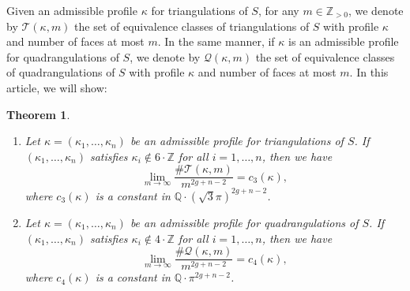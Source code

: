 \documentclass[11pt]{article}
\newcommand{\skpt}{\smallskip}
\numberwithin{equation}{section}
\newenvironment{enumeratei}
{\bgroup\def\theenumi{\roman{enumi}}\def\theenumii{\arabic{enumii}}\begin{enumerate}}
{\end{enumerate}\egroup}
\theoremstyle{plain}
\newtheorem{Theorem}{Theorem}[section]
\theoremstyle{definition}
\newcommand\Z{\mathbb{Z}}
\newcommand{\Q}{\mathbb{Q}}
\newcommand{\QQ}{\mathscr{Q}}
\newcommand{\TT}{\mathscr{T}}
\begin{document}
Given an admissible profile $\kappa$ for triangulations of $S$, for any $m\in \Z_{>0}$, we denote by $\TT(\kappa,m)$ the set of equivalence classes of triangulations of $S$ with profile $\kappa$ and number of faces at most $m$. In the same manner, if $\kappa$ is an admissible profile for quadrangulations of $S$, we denote by $\QQ(\kappa,m)$ the set of equivalence classes of quadrangulations of $S$ with profile $\kappa$ and number of faces at most $m$.
In this article, we will show:

\skpt
\begin{Theorem}\label{th:asymp:count}
\begin{enumeratei}
\item\label{th:asymp:counti}
Let $\kappa=(\kappa_1,\dots,\kappa_n)$ be an admissible profile for triangulations of $S$. If $(\kappa_1,\dots,\kappa_n)$ satisfies $\kappa_i\not\in 6\cdot\Z$ for all $i=1,\dots,n$, then we have
\begin{equation}\label{eq:asymp:triang}
\lim_{m \to \infty} \frac{\#\TT(\kappa,m)}{m^{2g+n-2}}=c_3(\kappa),
\end{equation}
where $c_3(\kappa)$ is a constant in $\Q\cdot(\sqrt{3}\pi)^{2g+n-2}$.

\item\label{th:asymp:countii}
Let $\kappa=(\kappa_1,\dots,\kappa_n)$ be an admissible profile for quadrangulations of $S$. If $(\kappa_1,\dots,\kappa_n)$ satisfies $\kappa_i\not\in 4\cdot\Z$ for all $i=1,\dots,n$, then we have
\begin{equation}\label{eq:asymp:quad}
\lim_{m \to \infty} \frac{\#\QQ(\kappa,m)}{m^{2g+n-2}}=c_4(\kappa),
\end{equation}
where $c_4(\kappa)$ is a constant in $\Q\cdot\pi^{2g+n-2}$.
\end{enumeratei}
\end{Theorem}
\end{document}
